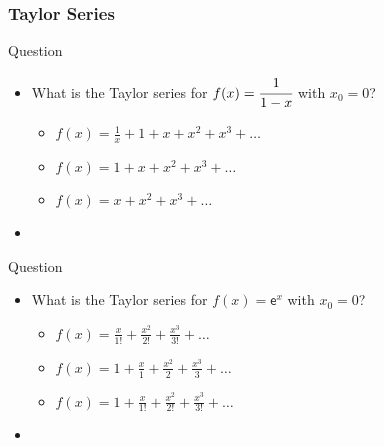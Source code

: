 \documentclass[%
  final,
  11pt, 
  show notes, %
  t, %
  fleqn, %
]{beamer}
\begin{document}
\begin{frame}[fragile]
  \frametitle{Taylor Series}
\begin{exampleblock}{Question}
\begin{itemize}
\item What is the Taylor series for $f(x) = \cfrac{1}{1-x}$ with $x_0 = 0$?
\begin{itemize}
\item $f(x) = \frac{1}{x} + 1 + x + x^2 + x^3 + \ldots$
\item $f(x) = 1 + x + x^2 + x^3 + \ldots$
\item $f(x) = x + x^2 + x^3 + \ldots$
\end{itemize}
\item \CourseQuiz
\end{itemize}
\end{exampleblock}
\pause
\begin{exampleblock}{Question}
\begin{itemize}
\item What is the Taylor series for $f(x) = \mathsf{e}^{x}$ with $x_0 = 0$?
\begin{itemize}
\item $f(x) = \frac{x}{1!} + \frac{x^2}{2!} + \frac{x^3}{3!} + \ldots$
\item $f(x) = 1 + \frac{x}{1} + \frac{x^2}{2} + \frac{x^3}{3} + \ldots$
\item $f(x) = 1 + \frac{x}{1!} + \frac{x^2}{2!} + \frac{x^3}{3!} + \ldots$
\end{itemize}
\item \CourseQuiz
\end{itemize}
\end{exampleblock}
\end{frame}

\end{document}
